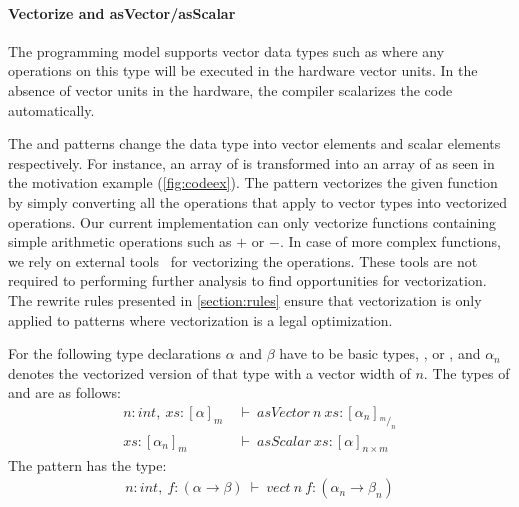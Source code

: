 \paragraph{Vectorize and asVector/asScalar}
The \OpenCL programming model supports vector data types such as  where any operations on this type will be executed in the hardware vector units.
In the absence of vector units in the hardware, the \OpenCL compiler scalarizes the code automatically.

The  and  patterns change the data type into vector elements and scalar elements respectively.
For instance, an array of  is transformed into an array of  as seen in the motivation example (\autoref{fig:codeex}).
The  pattern vectorizes the given function by simply converting all the operations that apply to vector types into vectorized operations. 
Our current implementation can only vectorize functions containing simple arithmetic operations such as $+$ or $-$.
In case of more complex functions, we rely on external tools~\cite{garrenberg11vect} for vectorizing the operations.
These tools are not required to performing further analysis to find opportunities for vectorization.
The rewrite rules presented in \autoref{section:rules} ensure that vectorization is only applied to patterns where vectorization is a legal optimization.

For the following type declarations $\alpha$ and $\beta$ have to be basic types, \eg,  or , and $\alpha_n$ denotes the vectorized version of that type with a vector width of $n$.
The types of  and  are as follows:
\begin{align}
  n : int,\ xs : [\alpha]_m\ &\vdash\ asVector\ n\ xs : [\alpha_n]_{{}^m/_n}
  \label{eq:type:asVector}
  \\
  xs : [\alpha_n]_m\ &\vdash\ asScalar\ xs : [\alpha]_{n \times m}
  \label{eq:type:asScalar}
\end{align}
The  pattern has the type:
\begin{align}
  n : int,\ f : (\alpha \rightarrow \beta)\ \vdash\ vect\ n\ f : (\alpha_n \rightarrow \beta_n)
\end{align}




















